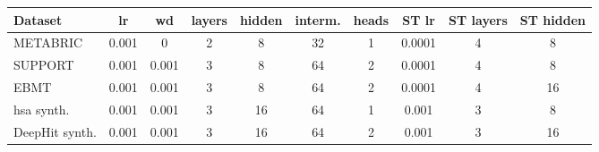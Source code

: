 \begin{tabular}{lccccccccc}
\toprule
Dataset & lr & wd & layers & hidden & interm. & heads & ST lr & ST layers & ST hidden \\
\midrule
METABRIC & 0.001 & 0 & 2 & 8 & 32 & 1 & 0.0001 & 4 & 8 \\
SUPPORT & 0.001 & 0.001 & 3 & 8 & 64 & 2 & 0.0001 & 4 & 8 \\
EBMT & 0.001 & 0.001 & 3 & 8 & 64 & 2 & 0.0001 & 4 & 16 \\
hsa synth. & 0.001 & 0.001 & 3 & 16 & 64 & 1 & 0.001 & 3 & 8 \\
DeepHit synth. & 0.001 & 0.001 & 3 & 16 & 64 & 2 & 0.001 & 3 & 16 \\
\bottomrule
\end{tabular}
